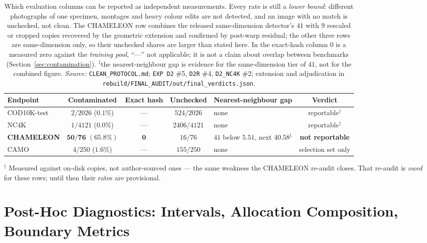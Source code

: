 \documentclass{article} %
\begin{document}
\begin{table}[t]
\caption{Which evaluation columns can be reported as independent measurements. Every rate is still a
\emph{lower bound}: different photographs of one specimen, montages and heavy colour edits are not
detected, and an image with no match is unchecked, not clean. The CHAMELEON row combines the
released same-dimension detector's $41$ with $9$ rescaled or cropped copies recovered by the
geometric extension and confirmed by post-warp residual; the other three rows are same-dimension
only, so their unchecked shares are larger than stated here. In the exact-hash column $0$ is a
measured zero against the \emph{training pool}, ``---'' not applicable; it is not a claim about
overlap between benchmarks (Section~\ref{sec:contamination}).
$^{\ddagger}$the nearest-neighbour gap is evidence for the same-dimension tier of $41$, not for the
combined figure. \emph{Source:} \texttt{CLEAN\_PROTOCOL.md}; \texttt{EXP D2} \#5, \texttt{D2R} \#4,
\texttt{D2\_NC4K} \#2; extension and adjudication in
\texttt{rebuild/FINAL\_AUDIT/out/final\_verdicts.json}.}
\label{tab:contamination}
\begin{center}
\small
\begin{tabular}{lccclc}
\toprule
Endpoint & Contaminated & Exact hash & Unchecked & Nearest-neighbour gap & Verdict \\
\midrule
COD10K-test & $2/2026$ \; ($0.1\%$) & --- & $524/2026$ & none & reportable$^\dagger$ \\
NC4K & $1/4121$ \; ($0.0\%$) & --- & $2406/4121$ & none & reportable$^\dagger$ \\
\textbf{CHAMELEON} & $\mathbf{50/76}$ \; $\mathbf{(65.8\%)}$ & $\mathbf{0}$ & $16/76$ & $41$ below $5.51$, next $40.58^{\ddagger}$ & \textbf{not reportable} \\
CAMO & $4/250$ \; ($1.6\%$) & --- & $155/250$ & none & selection set only \\
\bottomrule
\end{tabular}
\end{center}
\footnotesize $^\dagger$ Measured against on-disk copies, not author-sourced ones --- the same weakness
the CHAMELEON re-audit closes. That re-audit is \emph{owed} for these rows; until then their rates are
provisional.
\end{table}

\section{Post-Hoc Diagnostics: Intervals, Allocation Composition, Boundary Metrics}
\label{app:diag}
\end{document}
